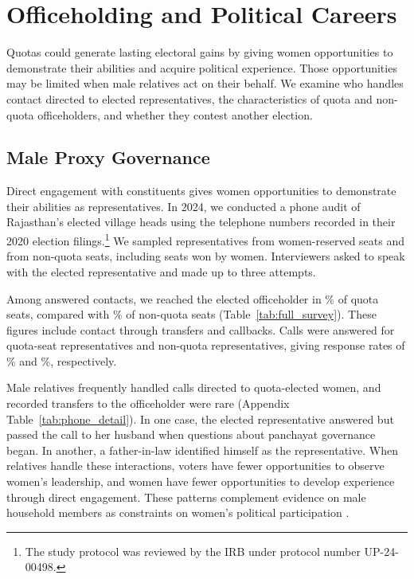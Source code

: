 \documentclass[11pt]{article}
\begin{document}
\FloatBarrier
\section{Officeholding and Political Careers}\label{sec:mechanisms}

Quotas could generate lasting electoral gains by giving women opportunities to demonstrate their abilities and acquire political experience. Those opportunities may be limited when male relatives act on their behalf. We examine who handles contact directed to elected representatives, the characteristics of quota and non-quota officeholders, and whether they contest another election.

\subsection{Male Proxy Governance}\label{sec:phone_audit}

Direct engagement with constituents gives women opportunities to demonstrate their abilities as representatives. In 2024, we conducted a phone audit of Rajasthan's elected village heads using the telephone numbers recorded in their 2020 election filings.\footnote{The study protocol was reviewed by the IRB under protocol number UP-24-00498.} We sampled \phoneQuotaSampled{} representatives from women-reserved seats and \phoneOpenSampled{} from non-quota seats, including seats won by women. Interviewers asked to speak with the elected representative and made up to three attempts.

Among answered contacts, we reached the elected officeholder in \phoneQuotaMemberPct{}\% of quota seats, compared with \phoneOpenMemberPct{}\% of non-quota seats (Table~\ref{tab:full_survey}). These figures include contact through transfers and callbacks. Calls were answered for \phoneQuotaAnswered{} quota-seat representatives and \phoneOpenAnswered{} non-quota representatives, giving response rates of \phoneQuotaResponsePct{}\% and \phoneOpenResponsePct{}\%, respectively.

Male relatives frequently handled calls directed to quota-elected women, and recorded transfers to the officeholder were rare (Appendix Table~\ref{tab:phone_detail}). In one case, the elected representative answered but passed the call to her husband when questions about panchayat governance began. In another, a father-in-law identified himself as the representative. When relatives handle these interactions, voters have fewer opportunities to observe women's leadership, and women have fewer opportunities to develop experience through direct engagement. These patterns complement evidence on male household members as constraints on women's political participation \citep{cheema2020canvassing, khan2021count, prillaman2023strength, kumar2024}.
\end{document}
